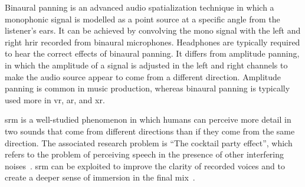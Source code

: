 \documentclass[fleqn]{jaes}
\begin{document}


Binaural panning is an advanced audio spatialization technique in which a monophonic signal is modelled as a point source at a specific angle from the listener's ears. It can be achieved by convolving the mono signal with the left and right \gls{hrir} recorded from binaural microphones. Headphones are typically required to hear the correct effects of binaural panning. It differs from amplitude panning, in which the amplitude of a signal is adjusted in the left and right channels to make the audio source appear to come from a different direction. Amplitude panning is common in music production, whereas binaural panning is typically used more in \gls{vr}, \gls{ar}, and \gls{xr}.

\gls{srm} is a well-studied phenomenon in which humans can perceive more detail in two sounds that come from different directions than if they come from the same direction. The associated research problem is \enquote{The cocktail party effect}, which refers to the problem of perceiving speech in the presence of other interfering noises~\cite{litovskySpatialReleaseMasking2012}. \gls{srm} can be exploited to improve the clarity of recorded voices and to create a deeper sense of immersion in the final mix~\cite{stewartEssentialRadioSkills2015}.
\end{document}
